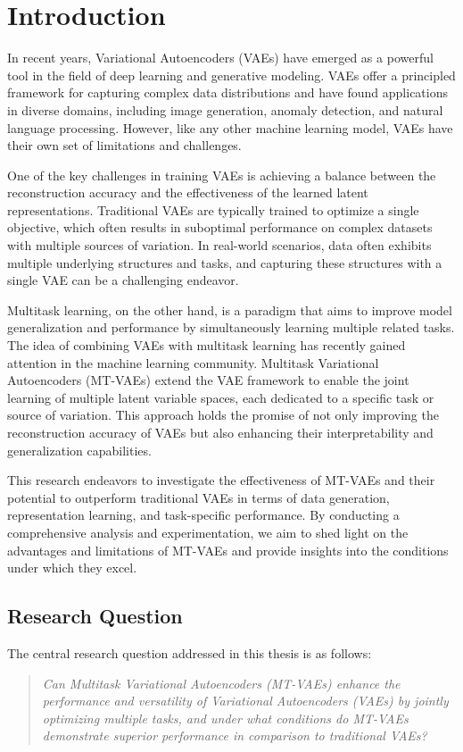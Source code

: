 \chapter{Introduction}

In recent years, Variational Autoencoders (VAEs) have emerged as a powerful tool in the field of deep learning and generative modeling. VAEs offer a principled framework for capturing complex data distributions and have found applications in diverse domains, including image generation, anomaly detection, and natural language processing. However, like any other machine learning model, VAEs have their own set of limitations and challenges.

One of the key challenges in training VAEs is achieving a balance between the reconstruction accuracy and the effectiveness of the learned latent representations. Traditional VAEs are typically trained to optimize a single objective, which often results in suboptimal performance on complex datasets with multiple sources of variation. In real-world scenarios, data often exhibits multiple underlying structures and tasks, and capturing these structures with a single VAE can be a challenging endeavor.

Multitask learning, on the other hand, is a paradigm that aims to improve model generalization and performance by simultaneously learning multiple related tasks. The idea of combining VAEs with multitask learning has recently gained attention in the machine learning community. Multitask Variational Autoencoders (MT-VAEs) extend the VAE framework to enable the joint learning of multiple latent variable spaces, each dedicated to a specific task or source of variation. This approach holds the promise of not only improving the reconstruction accuracy of VAEs but also enhancing their interpretability and generalization capabilities.

This research endeavors to investigate the effectiveness of MT-VAEs and their potential to outperform traditional VAEs in terms of data generation, representation learning, and task-specific performance. By conducting a comprehensive analysis and experimentation, we aim to shed light on the advantages and limitations of MT-VAEs and provide insights into the conditions under which they excel.

\section{Research Question}

The central research question addressed in this thesis is as follows:

\begin{quote}
\textit{Can Multitask Variational Autoencoders (MT-VAEs) enhance the performance and versatility of Variational Autoencoders (VAEs) by jointly optimizing multiple tasks, and under what conditions do MT-VAEs demonstrate superior performance in comparison to traditional VAEs?}
\end{quote}



